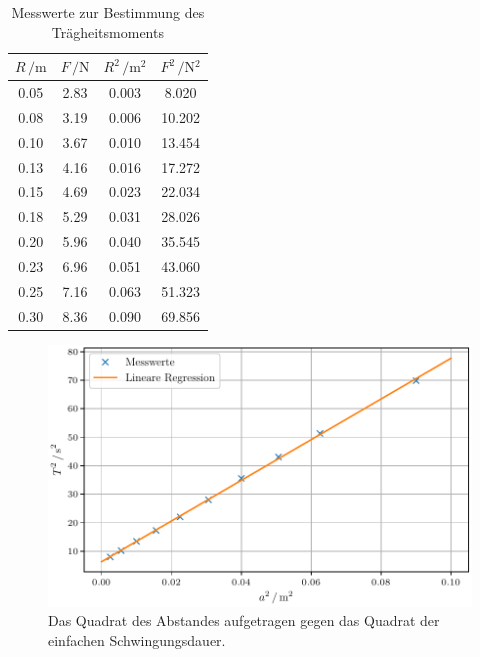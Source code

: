 \begin{table}[H]
  \centering
  \caption{Messwerte zur Bestimmung des Trägheitsmoments}
  \label{tab:Traegheitsmoment}
  \begin{tabular}{
  c c c c
  }
    \toprule
     $R \, / \unit{\meter}$ & $F\, / \unit{\newton}$
      & $R^2 \, / \unit{\meter^2}$ & $F^2\, / \unit{\newton^2}$\\
    \midrule
    0.05 & 2.83 & 0.003 & 8.020\\
    0.08 & 3.19 & 0.006 & 10.202\\
    0.10 & 3.67 & 0.010 & 13.454\\
    0.13 & 4.16 & 0.016 & 17.272\\
    0.15 & 4.69 & 0.023 & 22.034\\
    0.18 & 5.29 & 0.031 & 28.026\\
    0.20 & 5.96 & 0.040 & 35.545\\
    0.23 & 6.96 & 0.051 & 43.060\\
    0.25 & 7.16 & 0.063 & 51.323\\
    0.30 & 8.36 & 0.090 & 69.856\\
    \bottomrule
  \end{tabular}
\end{table}
\begin{figure}[H]
  \centering
  \includegraphics[scale=0.6]{plotI_D.pdf}
  \caption{Das Quadrat des Abstandes aufgetragen gegen das Quadrat der einfachen Schwingungsdauer.}
  \label{fig:Plot1}
\end{figure}

